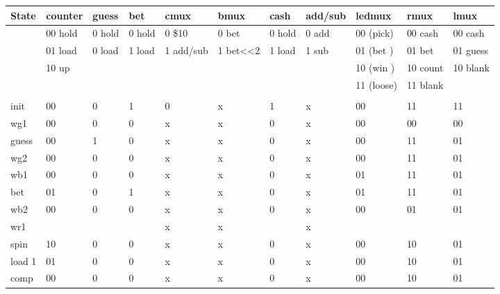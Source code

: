 \begin{enumerate}
\begin{solution}
{{\tiny
\begin{tabular}{l|l|l|l|l|l|l|l|l|l|l}
State &  counter& guess  & bet    & cmux      & bmux     & cash   & add/sub & ledmux    & rmux   & lmux \\ \hline
      & 00 hold & 0 hold & 0 hold & 0 \$10    & 0 bet    & 0 hold & 0 add  & 00 (pick) &00 cash &00 cash  \\ \hline
      & 01 load & 0 load & 1 load & 1 add/sub & 1 bet<<2 & 1 load & 1 sub  & 01 (bet ) &01 bet  &01 guess \\ \hline
      & 10 up   &        &        &  	      &          &        &        & 10 (win ) &10 count&10 blank \\ \hline
      &         &        &        &  	      &          &        &        & 11 (loose)&11 blank&         \\ \hline
      &         &        &        &  	      &          &        &        &          &         &   \\ \hline
init  & 00      & 0      &  1     & 0	      & x        &  1     &  x     & 00       &  11     & 11\\ \hline
wg1   & 00      & 0      &  0     & x	      & x        &  0     &  x     & 00       &  00     & 00\\ \hline
guess & 00      & 1      &  0     & x	      & x        &  0     &  x     & 00       &  11     & 01\\ \hline
wg2   & 00      & 0      &  0     & x	      & x        &  0     &  x     & 00       &  11     & 01\\ \hline
wb1   & 00      & 0      &  0     & x	      & x        &  0     &  x     & 01       &  11     & 01\\ \hline
bet   & 01      & 0      &  1     & x	      & x        &  0     &  x     & 01       &  11     & 01\\ \hline
wb2   & 00      & 0      &  0     & x	      & x        &  0     &  x     & 00       &  01     & 01\\ \hline
wr1   &         &        &        & x	      & x        &        &  x     &          &         &   \\ \hline
spin  & 10      & 0      &  0     & x	      & x        &  0     &  x     & 00       &  10     & 01\\ \hline
load 1& 01      & 0      &  0     & x	      & x        &  0     &  x     & 00       &  10     & 01\\ \hline
comp  & 00      & 0      &  0     & x	      & x        &  0     &  x     & 00       &  10     & 01\\ \hline

\end{tabular}}}
\end{solution}
\end{enumerate}
